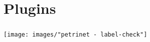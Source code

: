 






\section*{Plugins}


\begin{frame}
  \frametitle{}
  \centering
  \hspace{-1cm}
  \texttt{[image: images/"petrinet - label-check"]}
\end{frame}

